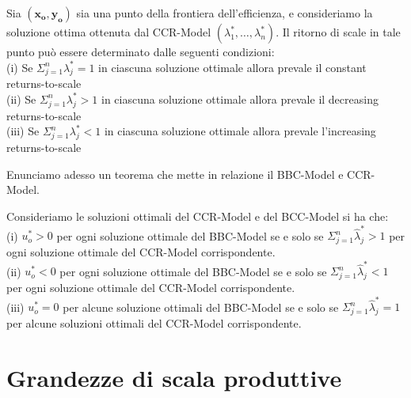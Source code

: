\begin{teor}
Sia $(\boldsymbol{x_o, y_o})$ sia una punto della frontiera dell'efficienza, e consideriamo la soluzione ottima ottenuta dal CCR-Model $(\lambda^*_1, \dots, \lambda^*_n)$. Il ritorno di scale in tale punto può essere determinato dalle seguenti condizioni:\\
(i) Se $\Sigma^n_{j = 1} \lambda^*_j = 1$ in ciascuna soluzione ottimale allora prevale il constant returns-to-scale \\
(ii) Se $\Sigma^n_{j = 1} \lambda^*_j > 1$ in ciascuna soluzione ottimale allora prevale il decreasing returns-to-scale \\
(iii) Se $\Sigma^n_{j = 1} \lambda^*_j < 1$ in ciascuna soluzione ottimale allora prevale l'increasing returns-to-scale \\
\end{teor}

Enunciamo adesso un teorema che mette in relazione il BBC-Model e CCR-Model.

\begin{teor}
Consideriamo le soluzioni ottimali del CCR-Model e del BCC-Model si ha che: \\
(i) $u^*_o > 0$ per ogni soluzione ottimale del BBC-Model se e solo se $\Sigma^n_{j = 1} \hat{\lambda}^*_j > 1$ per ogni soluzione ottimale del CCR-Model corrispondente.\\
(ii) $u^*_o < 0$ per ogni soluzione ottimale del BBC-Model se e solo se $\Sigma^n_{j = 1} \hat{\lambda}^*_j < 1$ per ogni soluzione ottimale del CCR-Model corrispondente.\\
(iii) $u^*_o = 0$ per alcune soluzione ottimali del BBC-Model se e solo se $\Sigma^n_{j = 1} \hat{\lambda}^*_j = 1$ per alcune soluzioni ottimali del CCR-Model corrispondente.\\
\end{teor}

\section{Grandezze di scala produttive}

